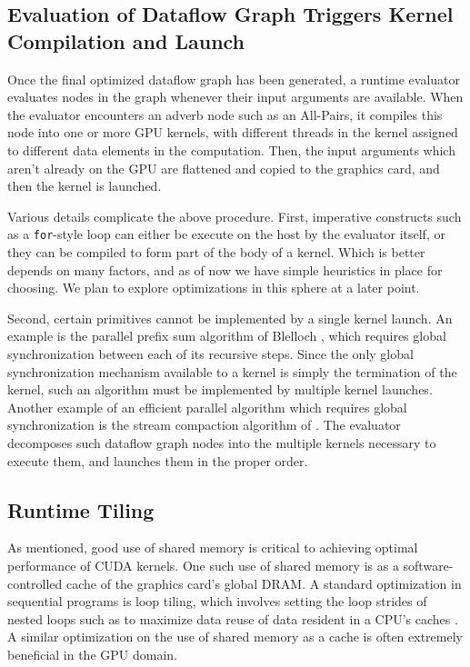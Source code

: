 \documentclass[preprint]{sigplanconf}
\begin{document}
\subsection{Evaluation of Dataflow Graph Triggers Kernel Compilation and Launch}
Once the final optimized dataflow graph has been generated, a runtime evaluator evaluates nodes in the graph whenever their input arguments are available.  When the evaluator encounters an adverb node such as an All-Pairs, it compiles this node into one or more GPU kernels, with different threads in the kernel assigned to different data elements in the computation.  Then, the input arguments which aren't already on the GPU are flattened and copied to the graphics card, and then the kernel is launched.

Various details complicate the above procedure.  First, imperative constructs such as a \texttt{for}-style loop can either be execute on the host by the evaluator itself, or they can be compiled to form part of the body of a kernel.  Which is better depends on many factors, and as of now we have simple heuristics in place for choosing.  We plan to explore optimizations in this sphere at a later point.

Second, certain primitives cannot be implemented by a single kernel launch.  An example is the parallel prefix sum algorithm of Blelloch \cite{Blel90}, which requires global synchronization between each of its recursive steps.  Since the only global synchronization mechanism available to a kernel is simply the termination of the kernel, such an algorithm must be implemented by multiple kernel launches.  Another example of an efficient parallel algorithm which requires global synchronization is the stream compaction algorithm of \cite{Bill09}.  The evaluator decomposes such dataflow graph nodes into the multiple kernels necessary to execute them, and launches them in the proper order.

\subsection{Runtime Tiling}
As mentioned, good use of shared memory is critical to achieving optimal performance of CUDA kernels.  One such use of shared memory is as a software-controlled cache of the graphics card's global DRAM.  A standard optimization in sequential programs is loop tiling, which involves setting the loop strides of nested loops such as to maximize data reuse of data resident in a CPU's caches \cite{Wolf91}.  A similar optimization on the use of shared memory as a cache is often extremely beneficial in the GPU domain.
\end{document}
